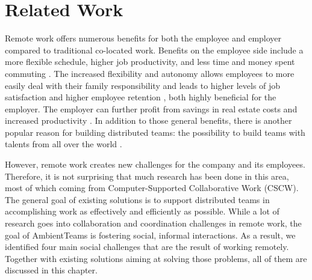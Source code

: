 \chapter{Related Work}
Remote work offers numerous benefits for both the employee and employer compared to traditional co-located work. Benefits on the employee side include a more flexible schedule, higher job productivity, and less time and money spent commuting \autocite{flores2019understanding, mulki2009set}. The increased flexibility and autonomy allows employees to more easily deal with their family responsibility and leads to higher levels of job satisfaction and higher employee retention \autocite{mulki2009set, gajendran2007good, madsen2011benefits}, both highly beneficial for the employer. The employer can further profit from savings in real estate costs and increased productivity \autocite{mulki2009set}. In addition to those general benefits, there is another popular reason for building distributed teams: the possibility to build teams with talents from all over the world \autocite{carmel1999global}.

However, remote work creates new challenges for the company and its employees. Therefore, it is not surprising that much research has been done in this area, most of which coming from Computer-Supported Collaborative Work (CSCW). The general goal of existing solutions is to support distributed teams in accomplishing work as effectively and efficiently as possible. While a lot of research goes into collaboration and coordination challenges in remote work, the goal of AmbientTeams is fostering social, informal interactions. As a result, we identified four main social challenges that are the result of working remotely. Together with existing solutions aiming at solving those problems, all of them are discussed in this chapter.



